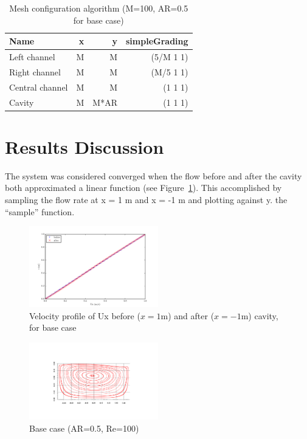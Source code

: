 \documentclass[twocolumn,10pt]{asme2ej}
\begin{document}
\begin{table}[tb]
\begin{center}
\begin{tabular}{| l | r r r | }
\hline
Name            & x &  y    & simpleGrading \\
\hline
Left channel    & M &  M    & (5/M 1 1) \\
Right channel   & M &  M    & (M/5 1 1) \\
Central channel & M &  M    & (1   1 1) \\
Cavity          & M &  M*AR & (1   1 1) \\
\hline
\end{tabular}
\caption{Mesh configuration algorithm (M=100, AR=0.5 for base case)}
\label{mesh_generation}
\end{center}
\end{table}

\section{Results Discussion}

The system was considered converged when the flow before and after the cavity both approximated a linear function (see Figure~\ref{velocity_profile}). This accomplished by sampling the flow rate at x = 1 m and x = -1 m and plotting against y. the ``sample'' function.

\begin{figure}[tbh]
\begin{center}
\includegraphics[width=0.5\textwidth]{figure/Ar0.5-Re100 Ux before and after.pdf}
\caption{Velocity profile of Ux before ($x = 1 $m) and after ($x = -1 $m) cavity, for base case}
\label{velocity_profile}
\end{center}
\end{figure}

\begin{figure}[tbh]
\begin{center}
\includegraphics[width=0.5\textwidth]{figure/AR0.5-Re100 streamFunction axis final.pdf}
\caption{Base case (AR=0.5, Re=100)}
\label{}
\end{center}
\end{figure}
\end{document}
